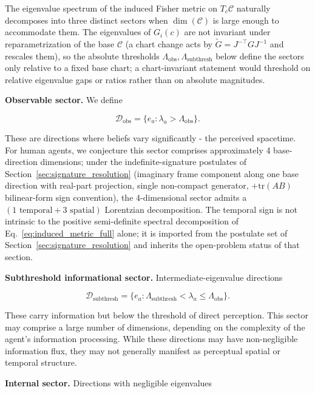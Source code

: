 \documentclass[11pt]{article}
\begin{document}
The eigenvalue spectrum of the induced Fisher metric on $T_c\mathcal{C}$ naturally decomposes into three distinct sectors when $\dim(\mathcal{C})$ is large enough to accommodate them. The eigenvalues of $G_i(c)$ are not invariant under reparametrization of the base $\mathcal{C}$ (a chart change acts by $\tilde{G} = J^{-\top} G J^{-1}$ and rescales them), so the absolute thresholds $\Lambda_{\text{obs}}, \Lambda_{\text{subthresh}}$ below define the sectors only relative to a fixed base chart; a chart-invariant statement would threshold on relative eigenvalue gaps or ratios rather than on absolute magnitudes.

\textbf{Observable sector.} We define

\begin{equation}
\mathcal{D}_{\text{obs}} = \{e_a : \lambda_a > \Lambda_{\text{obs}}\}.
\end{equation}

These are directions where beliefs vary significantly - the perceived spacetime. For human agents, we conjecture this sector comprises approximately 4 base-direction dimensions; under the indefinite-signature postulates of Section~\ref{sec:signature_resolution} (imaginary frame component along one base direction with real-part projection, single non-compact generator, $+\mathrm{tr}(AB)$ bilinear-form sign convention), the 4-dimensional sector admits a $(1\text{ temporal} + 3\text{ spatial})$ Lorentzian decomposition. The temporal sign is not intrinsic to the positive semi-definite spectral decomposition of Eq.~\eqref{eq:induced_metric_full} alone; it is imported from the postulate set of Section~\ref{sec:signature_resolution} and inherits the open-problem status of that section.

\textbf{Subthreshold informational sector.} Intermediate-eigenvalue directions

\begin{equation}
\mathcal{D}_{\text{subthresh}} = \{e_a : \Lambda_{\text{subthresh}} < \lambda_a \leq \Lambda_{\text{obs}}\}.
\end{equation}

These carry information but below the threshold of direct perception. This sector may comprise a large number of dimensions, depending on the complexity of the agent's information processing. While these directions may have non-negligible information flux, they may not generally manifest as perceptual spatial or temporal structure.

\textbf{Internal sector.} Directions with negligible eigenvalues
\end{document}
